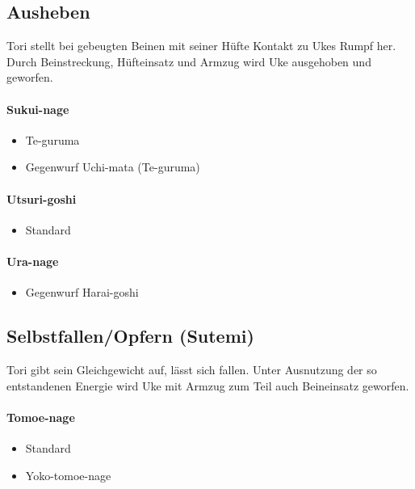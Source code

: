 \documentclass[justified, a4paper, notitlepage, captions=tableheading, nobib]{tufte-handout}
\begin{document}
\subsection{Ausheben }
\label{sec:org8f2bef2}
Tori stellt bei gebeugten Beinen mit seiner Hüfte Kontakt zu Ukes Rumpf her. Durch Beinstreckung, Hüfteinsatz und Armzug wird Uke ausgehoben und geworfen.

\paragraph{Sukui-nage }
\label{sec:org15b177f}
\begin{itemize}
\item Te-guruma
\item Gegenwurf Uchi-mata (Te-guruma)
\end{itemize}

\paragraph{Utsuri-goshi }
\label{sec:orgf602f7d}
\begin{itemize}
\item Standard
\end{itemize}

\paragraph{Ura-nage }
\label{sec:org70ea32d}
\begin{itemize}
\item Gegenwurf Harai-goshi
\end{itemize}

\subsection{Selbstfallen/Opfern (Sutemi) }
\label{sec:org18c64c1}
Tori gibt sein Gleichgewicht auf, lässt sich fallen. Unter Ausnutzung der so entstandenen Energie wird Uke mit Armzug zum Teil auch Beineinsatz geworfen.

\paragraph{Tomoe-nage }
\label{sec:org43abd10}
\begin{itemize}
\item Standard
\item Yoko-tomoe-nage
\end{itemize}
\end{document}
